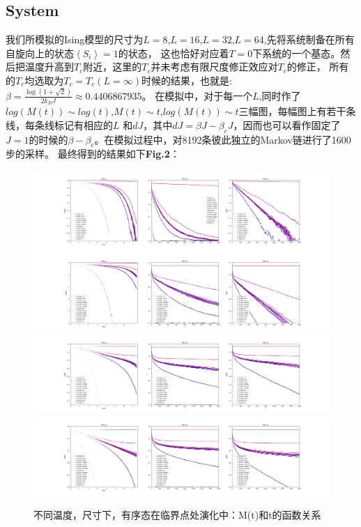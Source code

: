 \documentclass[a4paper]{article}
\begin{document}
\subsection{System}
我们所模拟的Ising模型的尺寸为$L=8$,$L=16$,$L=32$,$L=64$,先将系统制备在所有自旋向上的状态$\left\langle S_i \right\rangle=1$的状态，
这也恰好对应着$T=0$下系统的一个基态。然后把温度升高到$T_c$附近，这里的$T_c$并未考虑有限尺度修正效应对$T_c$的修正，
所有的$T_c$均选取为$T_c=T_c(L=\infty)$时候的结果，也就是:$\beta=\frac{\log(1+\sqrt{2})}{2k_BJ}\approx 0.4406867935$。
在模拟中，对于每一个$L$,同时作了$log(M(t))\sim log(t)$,$M(t)\sim t$,$log(M(t))\sim t$三幅图，每幅图上有若干条线，每条线标记有相应的$L$
和$dJ$，其中$dJ=\beta J-\beta_c J$，因而也可以看作固定了$J=1$的时候的$\beta-\beta_c$。在模拟过程中，对8192条彼此独立的Markov链进行了1600步的采样。
最终得到的结果如下\textbf{Fig.2}：
\begin{figure}[h]
    \centering
    {
    \includegraphics[width=20.0cm]{../figure/fig8.png}}
    \hspace{0in}    %
    {
    \includegraphics[width=20.0cm]{../figure/fig16.png}}
    \hspace{0in}
    {
    \includegraphics[width=20.0cm]{../figure/fig32.png}}
    \hspace{0in}
    {
    \includegraphics[width=20.0cm]{../figure/fig64.png}}
    \hspace{0in}
    \caption{不同温度，尺寸下，有序态在临界点处演化中：M(t)和t的函数关系}
\end{figure}
\end{document}
